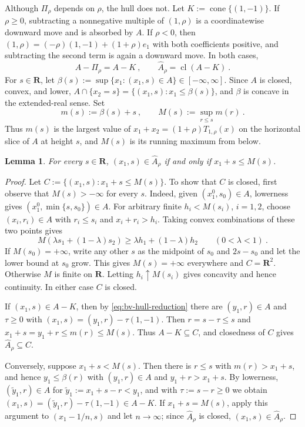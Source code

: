 \documentclass[11pt]{article}
\newcommand{\red}[1]{{\color{red}#1}} %
\numberwithin{equation}{section}
\newtheorem{lemma}{Lemma}
\theoremstyle{definition}
\begin{document}
Although $\Pi_\rho$ depends on $\rho$, the hull does not. Let $K:=\operatorname{cone}\{(1,-1)\}$. If $\rho\ge0$, subtracting a nonnegative multiple of $(1,\rho)$ is a coordinatewise downward move and is absorbed by $A$. If $\rho<0$, then $(1,\rho)=(-\rho)(1,-1)+(1+\rho)e_1$ with both coefficients positive, and subtracting the second term is again a downward move. In both cases,
\begin{equation}\label{eq:bv-hull-reduction}
A-\Pi_\rho=A-K~,
\qquad
\widehat A_\rho=\operatorname{cl}(A-K)~.
\end{equation}
For $s\in\mathbf R$, let $\beta(s):=\sup\{x_1:(x_1,s)\in A\}\in[-\infty,\infty]$. Since $A$ is closed, convex, and lower, $A\cap\{x_2=s\}=\{(x_1,s):x_1\le\beta(s)\}$, and $\beta$ is concave in the extended-real sense. Set
\[
m(s):=\beta(s)+s~,
\qquad
M(s):=\sup_{r\le s}m(r)~.
\]
Thus $m(s)$ is the largest value of $x_1+x_2=(1+\rho)T_{1,\rho}(x)$ on the horizontal slice of $A$ at height $s$, and $M(s)$ is its running maximum from below.

\begin{lemma}\label{lem:bv-slice}
For every $s\in\mathbf R$, $(x_1,s)\in\widehat A_\rho$ if and only if $x_1+s\le M(s)$.
\end{lemma}

\begin{proof}
\red{Let $C:=\{(x_1,s):x_1+s\le M(s)\}$. To show that $C$ is closed, first observe that $M(s)>-\infty$ for every $s$. Indeed, given $(x_1^0,s_0)\in A$, lowerness gives $(x_1^0,\min\{s,s_0\})\in A$. For arbitrary finite $h_i<M(s_i)$, $i=1,2$, choose $(x_i,r_i)\in A$ with $r_i\le s_i$ and $x_i+r_i>h_i$. Taking convex combinations of these two points gives
\[
 M(\lambda s_1+(1-\lambda)s_2)\ge\lambda h_1+(1-\lambda)h_2
 \qquad(0<\lambda<1)~.
\]
If $M(s_0)=+\infty$, write any other $s$ as the midpoint of $s_0$ and $2s-s_0$ and let the lower bound at $s_0$ grow. This gives $M(s)=+\infty$ everywhere and $C=\mathbf R^2$. Otherwise $M$ is finite on $\mathbf R$. Letting $h_i\uparrow M(s_i)$ gives concavity and hence continuity. In either case $C$ is closed.}

If $(x_1,s)\in A-K$, then by \eqref{eq:bv-hull-reduction} there are $(y_1,r)\in A$ and $\tau\ge0$ with $(x_1,s)=(y_1,r)-\tau(1,-1)$. Then $r=s-\tau\le s$ and $x_1+s=y_1+r\le m(r)\le M(s)$. Thus $A-K\subseteq C$, and closedness of $C$ gives $\widehat A_\rho\subseteq C$.

Conversely, suppose $x_1+s<M(s)$. Then there is $r\le s$ with $m(r)>x_1+s$, and hence $y_1\le\beta(r)$ with $(y_1,r)\in A$ and $y_1+r>x_1+s$. By lowerness, $(\widetilde y_1,r)\in A$ for $\widetilde y_1:=x_1+s-r<y_1$, and with $\tau:=s-r\ge0$ we obtain $(x_1,s)=(\widetilde y_1,r)-\tau(1,-1)\in A-K$. If $x_1+s=M(s)$, apply this argument to $(x_1-1/n,s)$ and let $n\to\infty$; since $\widehat A_\rho$ is closed, $(x_1,s)\in\widehat A_\rho$.
\end{proof}
\end{document}
